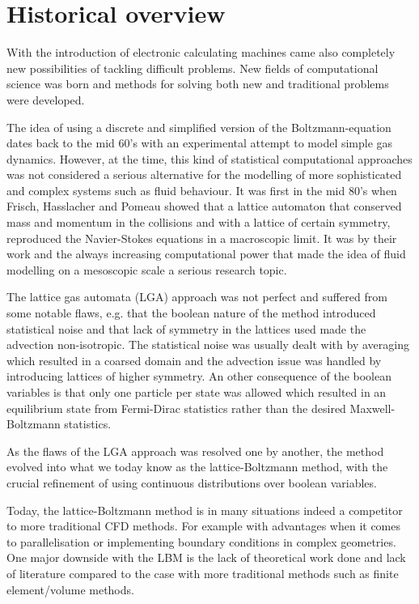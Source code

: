 \section{Historical overview}
With the introduction of electronic calculating machines came also
completely new possibilities of tackling difficult problems. New
fields of computational science was born and methods for solving both
new and traditional problems were developed.

The idea of using a discrete and simplified version of the
Boltzmann-equation dates back to the mid 60's \cite{scholarpedia-lbm}
with an experimental attempt to model simple gas dynamics. However, at
the time, this kind of statistical computational approaches was not
considered a serious alternative for the modelling of more
sophisticated and complex systems such as fluid behaviour. It was
first in the mid 80's when Frisch, Hasslacher and Pomeau showed that a
lattice automaton that conserved mass and momentum in the collisions
and with a lattice of certain symmetry, reproduced the Navier-Stokes
equations in a macroscopic limit. It was by their work and the always
increasing computational power that made the idea of fluid modelling
on a mesoscopic scale a serious research topic. \cite{wolf-gladrow}

The lattice gas automata (LGA) approach was not perfect and suffered
from some notable flaws, e.g. that the boolean nature of the method
introduced statistical noise and that lack of symmetry in the lattices
used made the advection non-isotropic. The statistical noise was
usually dealt with by averaging which resulted in a coarsed domain and
the advection issue was handled by introducing lattices of higher
symmetry. An other consequence of the boolean variables is that only one
particle per state was allowed which resulted in an equilibrium state
from Fermi-Dirac statistics rather than the desired Maxwell-Boltzmann
statistics. 

As the flaws of the LGA approach was resolved one by
another, the method evolved into what we today know as the
lattice-Boltzmann method, with the crucial refinement of using
continuous distributions over boolean variables. \cite{wolf-gladrow}

Today, the lattice-Boltzmann method is in many situations indeed a
competitor to more traditional CFD methods. For example with
advantages when it comes to parallelisation or implementing boundary
conditions in complex geometries. One major downside with the LBM is
the lack of theoretical work done and lack of literature compared to
the case with more traditional methods such as finite element/volume
methods. \cite{junk-asym}

